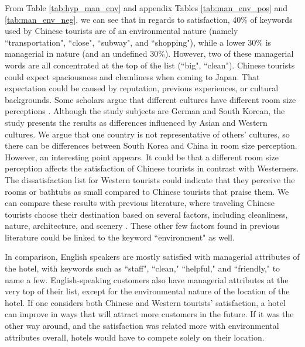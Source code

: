 \documentclass[smallextended,natbib]{svjour3}       %
\begin{document}
From Table \ref{tab:hyp_man_env} and appendix Tables \ref{tab:man_env_pos} and \ref{tab:man_env_neg}, we can see that in regards to satisfaction, 40\% of keywords used by Chinese tourists are of an environmental nature (namely ``transportation", ``close", ``subway", and ``shopping"), while a lower 30\% is managerial in nature (and an undefined 30\%). However, two of these managerial words are all concentrated at the top of the list (``big", ``clean"). Chinese tourists could expect spaciousness and cleanliness when coming to Japan. That expectation could be caused by reputation, previous experiences, or cultural backgrounds. Some scholars argue that different cultures have different room size perceptions \cite{Saulton2017}. Although the study subjects are German and South Korean, the study presents the results as differences influenced by Asian and Western cultures. We argue that one country is not representative of others' cultures, so there can be differences between South Korea and China in room size perception. However, an interesting point appears. It could be that a different room size perception affects the satisfaction of Chinese tourists in contrast with Westerners. The dissatisfaction list for Western tourists could indicate that they perceive the rooms or bathtubs as small compared to Chinese tourists that praise them. We can compare these results with previous literature, where traveling Chinese tourists choose their destination based on several factors, including cleanliness, nature, architecture, and scenery \cite[][]{ryan2001}. These other few factors found in previous literature could be linked to the keyword ``environment" as well.

In comparison, English speakers are mostly satisfied with managerial attributes of the hotel, with keywords such as ``staff", ``clean," ``helpful," and ``friendly," to name a few. English-speaking customers also have managerial attributes at the very top of their list, except for the environmental nature of the location of the hotel. If one considers both Chinese and Western tourists' satisfaction, a hotel can improve in ways that will attract more customers in the future. If it was the other way around, and the satisfaction was related more with environmental attributes overall, hotels would have to compete solely on their location. 
\end{document}
